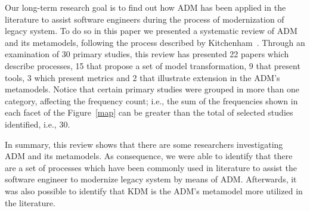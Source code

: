 Our long-term research goal is to find out how ADM has been applied in the literature to assist software engineers during the process of modernization of legacy system. To do so in this paper we presented a systematic review of ADM and its metamodels, following the process described by Kitchenham~\cite{Kitchenham}. Through an examination of 30 primary studies, this review has presented 22 papers which describe processes, 15 that propose a set of model transformation, 9 that present tools, 3 which present metrics and 2 that illustrate extension in the ADM's metamodels. Notice that certain primary studies were grouped in more than one category, affecting the frequency count; i.e., the sum of the frequencies shown in each facet of the Figure~\ref{map} can be greater than the total of selected studies identified, i.e., 30. %


In summary, this review shows that there are some researchers investigating ADM and its metamodels. As consequence, we were able to identify that there are a set of processes which have been commonly used in literature to assist the software engineer to modernize legacy system by means of ADM. Afterwards, it was also possible to identify that KDM is the ADM's metamodel more utilized in the literature. %




